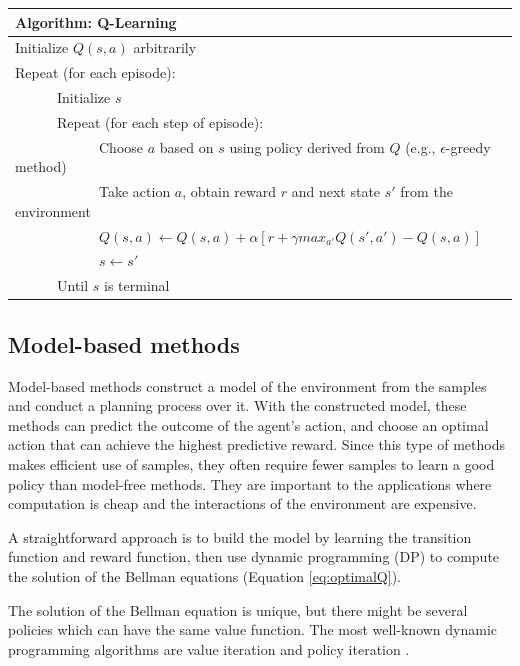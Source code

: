 \begin{center}
\begin{tabular}{@{}lp{6cm}@{}}
\hline
Algorithm: Q-Learning\\
\hline
Initialize $Q(s, a)$ arbitrarily\\
Repeat (for each episode):\\
\ \ \ \ \ \ Initialize $s$\\
\ \ \ \ \ \ Repeat (for each step of episode):\\
\ \ \ \ \ \ \ \ \ \ \ \ Choose $a$ based on $s$ using policy derived from $Q$ (e.g., $\epsilon$-greedy method)\\
\ \ \ \ \ \ \ \ \ \ \ \ Take action $a$, obtain reward $r$ and next state $s'$ from the environment\\
\ \ \ \ \ \ \ \ \ \ \ \ $Q(s, a) \leftarrow Q(s, a) + \alpha [r + \gamma max_{a'} Q(s', a')-Q(s, a)]$\\
\ \ \ \ \ \ \ \ \ \ \ \ $s \leftarrow s'$\\
\ \ \ \ \ \ Until $s$ is terminal\\
\hline  
\end{tabular}
\end{center}

\subsection{Model-based methods}
\label{se:modelbased}
Model-based methods construct a model of the environment from the samples and
conduct a planning process over it. With the constructed model, these methods
can predict the outcome of the agent's action, and choose an optimal action
that can achieve the highest predictive reward. Since this type of methods
makes efficient use of samples, they often require fewer samples to learn a
good policy than model-free methods. They are important to the applications
where computation is cheap and the interactions of the environment are
expensive.

A straightforward approach is to build the model by learning the transition function and
reward function, then use dynamic programming (DP) to compute the solution of the
Bellman equations (Equation \ref{eq:optimalQ}).

The solution of the Bellman equation is unique, but there might be several policies
which can have the same value function. The most well-known dynamic
programming algorithms are value iteration \cite{Bellman57} and policy
iteration \cite{Howard1960}.


